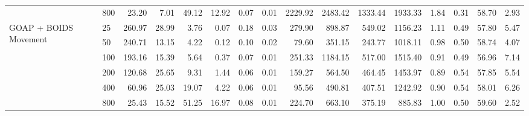 \begin{table}[htbp]
\begin{tabular}{llrrrrrrrrrrrrrr}
 & 800 & 23.20 & 7.01 & 49.12 & 12.92 & 0.07 & 0.01 & 2229.92 & 2483.42 & 1333.44 & 1933.33 & 1.84 & 0.31 & 58.70 & 2.93 \\
\cline{1-16}
\multirow[t]{6}{*}{GOAP + BOIDS Movement} & 25 & 260.97 & 28.99 & 3.76 & 0.07 & 0.18 & 0.03 & 279.90 & 898.87 & 549.02 & 1156.23 & 1.11 & 0.49 & 57.80 & 5.47 \\
 & 50 & 240.71 & 13.15 & 4.22 & 0.12 & 0.10 & 0.02 & 79.60 & 351.15 & 243.77 & 1018.11 & 0.98 & 0.50 & 58.74 & 4.07 \\
 & 100 & 193.16 & 15.39 & 5.64 & 0.37 & 0.07 & 0.01 & 251.33 & 1184.15 & 517.00 & 1515.40 & 0.91 & 0.49 & 56.96 & 7.14 \\
 & 200 & 120.68 & 25.65 & 9.31 & 1.44 & 0.06 & 0.01 & 159.27 & 564.50 & 464.45 & 1453.97 & 0.89 & 0.54 & 57.85 & 5.54 \\
 & 400 & 60.96 & 25.03 & 19.07 & 4.22 & 0.06 & 0.01 & 95.56 & 490.81 & 407.51 & 1242.92 & 0.90 & 0.54 & 58.01 & 6.26 \\
 & 800 & 25.43 & 15.52 & 51.25 & 16.97 & 0.08 & 0.01 & 224.70 & 663.10 & 375.19 & 885.83 & 1.00 & 0.50 & 59.60 & 2.52 \\
\cline{1-16}
\bottomrule
\end{tabular}
\end{table}
